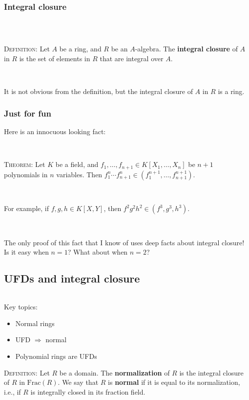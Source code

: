 \documentclass[12pt]{amsart}
\newcommand{\0}{$\phantom{.}$}
\newcommand{\1}{\mathbbm{1}}
\newcommand{\sssec}[1]{\subsubsection*{#1}}
\begin{document}
\

\sssec{Integral closure} \0 

\

\noindent \textsc{Definition:} Let $A$ be a ring, and $R$ be an $A$-algebra. The \textbf{integral closure} of $A$ in $R$ is the set of elements in $R$ that are integral over $A$.

\

\noindent  It is not obvious from the definition, but the integral closure of $A$ in $R$ is a ring.


\vfill

\noindent \hrulefill

\subsubsection*{Just for fun} Here is an innocuous looking fact:

\

\noindent \textsc{Theorem:}  Let $K$ be a field, and $f_1,\dots,f_{n+1}\in K[X_1,\dots,X_n]$ be $n+1$ polynomials in $n$ variables. Then 
$f_1^n \cdots f_{n+1}^n \in (f_1^{n+1},\dots,f_{n+1}^{n+1})$.

\

\noindent For example, if $f,g,h\in K[X,Y]$, then $f^2 g^2 h^2\in (f^3,g^3,h^3)$.

\

\noindent The only proof of this fact that I know of uses deep facts about integral closure! Is it easy when $n=1$? What about when $n=2$?



\newpage
\subsection{UFDs and integral closure} \0

\begin{framed} Key topics:
\begin{itemize}
\item Normal rings
\item UFD $\Longrightarrow$ normal
\item Polynomial rings are UFDs
\end{itemize}
\end{framed}

\noindent \textsc{Definition:} Let $R$ be a domain. The \textbf{normalization} of $R$ is the integral closure of $R$ in $\mathrm{Frac}(R)$. We say that $R$ is \textbf{normal} if it is equal to its normalization, i.e., if $R$ is integrally closed in its fraction field.
\end{document}
